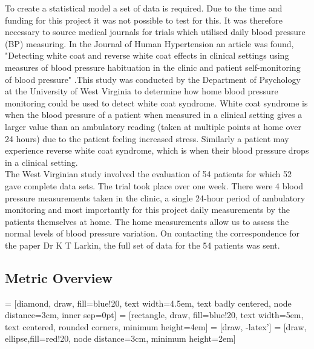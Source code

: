 \documentclass[11pt]{article}
\begin{document}
To create a statistical model a set of data is required. Due to the time and funding for this project it was not possible to test for this. It was therefore necessary to source medical journals for trials which utilised daily blood pressure (BP) measuring. In the Journal of Human Hypertension an article was found, "Detecting white coat and reverse white coat effects in clinical settings using measures of blood pressure habituation in the clinic and patient self-monitoring of blood pressure" \cite{study} .This study was conducted by the Department of Psychology at the University of West Virginia to determine how home blood pressure monitoring could be used to detect white coat syndrome. White coat syndrome is when the blood pressure of a patient when measured in a clinical setting gives a larger value than an ambulatory reading (taken at multiple points at home over 24 hours) due to the patient feeling increased stress. Similarly a patient may experience reverse white coat syndrome, which is when their blood pressure drops in a clinical setting. 
\\ \indent
The West Virginian study involved the evaluation of 54 patients for which 52 gave complete data sets. The trial took place over one week. There were 4 blood pressure measurements taken in the clinic, a single 24-hour period of ambulatory monitoring and most importantly for this project daily measurements by the patients themselves at home. The home measurements allow us to assess the normal levels of blood pressure variation. On contacting the correspondence for the paper Dr K T Larkin, the full set of data for the 54 patients was sent. 

\subsection{Metric Overview}

 = [diamond, draw, fill=blue!20, 
text width=4.5em, text badly centered, node distance=3cm, inner sep=0pt]
 = [rectangle, draw, fill=blue!20, 
text width=5em, text centered, rounded corners, minimum height=4em]
 = [draw, -latex']
 = [draw, ellipse,fill=red!20, node distance=3cm,
minimum height=2em]
\end{document}
